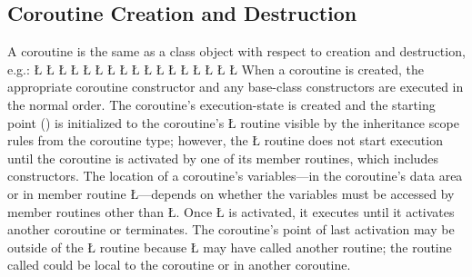 \documentclass[openright,twoside]{report}
\begin{document}
\subsection{Coroutine Creation and Destruction}
\label{s:CoroutineCreationDestruction}

A coroutine is the same as a class object with respect to creation and destruction, e.g.:
\LGinlinefalse\LGbegin\lgrinde
\L{}
\L{\LB{}}
\CE{}\L{}
\L{\LB{}}
\L{\LB{\};}}
\L{}
\CE{}\L{}
\CE{}\L{\LB{}}
\CE{}\L{\LB{}}
\CE{}\L{\LB{}}
\L{\LB{}}
\CE{}\L{\LB{}}
\CE{}\L{\LB{}}
\CE{}\L{\LB{}}
\L{}
\CE{}\L{}
\L{}
\CE{}\endlgrinde\LGend
When a coroutine is created, the appropriate coroutine constructor and any base-class constructors are executed in the normal order.
The coroutine's execution-state is created and the starting point () is initialized to the coroutine's \LGinlinetrue\LGbegin\lgrinde\L{}\endlgrinde\LGend{} routine visible by the inheritance scope rules from the coroutine type;
however, the \LGinlinetrue\LGbegin\lgrinde\L{}\endlgrinde\LGend{} routine does not start execution until the coroutine is activated by one of its member routines, which includes constructors.
The location of a coroutine's variables---in the coroutine's data area or in member routine \LGinlinetrue\LGbegin\lgrinde\L{}\endlgrinde\LGend{}---depends on whether the variables must be accessed by member routines other than \LGinlinetrue\LGbegin\lgrinde\L{}\endlgrinde\LGend{}.
Once \LGinlinetrue\LGbegin\lgrinde\L{}\endlgrinde\LGend{} is activated, it executes until it activates another coroutine or terminates.
The coroutine's point of last activation may be outside of the \LGinlinetrue\LGbegin\lgrinde\L{}\endlgrinde\LGend{} routine because \LGinlinetrue\LGbegin\lgrinde\L{}\endlgrinde\LGend{} may have called another routine;
the routine called could be local to the coroutine or in another coroutine.
\end{document}
